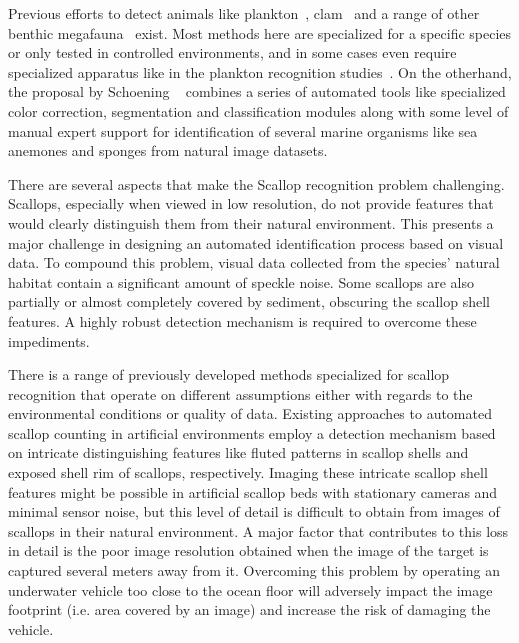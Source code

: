 \documentclass {udthesis}
\begin{document}
Previous efforts to detect animals like plankton~\cite{mcgavin_plankton, stelzer_rotifier}, clam~\cite{forrest_clam} and a range of other benthic megafauna~\cite{schoening} exist. Most methods here are specialized for a specific species or only tested in controlled environments, and in some cases even require specialized apparatus like in the plankton recognition studies~\cite{mcgavin_plankton, stelzer_rotifier}. On the otherhand, the proposal by Schoening ~\cite{schoening} combines a series of automated tools like specialized color correction, segmentation and classification modules along with some level of manual expert support for identification of several marine organisms like sea anemones and sponges from natural image datasets. 

There are several aspects that make the Scallop recognition problem challenging.
Scallops, especially when viewed in low resolution, do not provide features
that would clearly distinguish them from their natural environment.  This
presents a major challenge in designing an automated identification process 
based on visual data.  To compound this problem, visual data collected
from the species' natural habitat contain a
significant amount of speckle noise.
Some scallops are also partially or almost completely
covered by sediment, obscuring the scallop shell features.
A highly robust detection mechanism is required to overcome these impediments.

There is a range of previously developed methods specialized for scallop recognition 
\cite{dawkings13,guomundsson,enomoto9,enomoto10,fearn, prasanna_med, prasanna_aslo, prasanna_igi} 
that operate on different assumptions either with regards to the environmental conditions or quality of data.
Existing approaches to automated scallop counting in artificial environments
 \cite{enomoto9, enomoto10} employ a detection mechanism based on intricate distinguishing features 
like fluted patterns in scallop shells and exposed shell rim of scallops, respectively.
Imaging these intricate scallop shell features might
be possible in artificial scallop beds with stationary cameras and 
minimal sensor noise, but this level of detail 
is difficult to obtain from images of scallops in their natural environment. 
A major factor that contributes to this loss in detail
is the poor image resolution obtained when the image of the target
is captured several meters away from it. 
Overcoming this problem by operating an underwater vehicle too close to the ocean floor 
will adversely impact the image footprint (i.e. area covered by an image) and increase the risk of damaging the vehicle.
\end{document}
